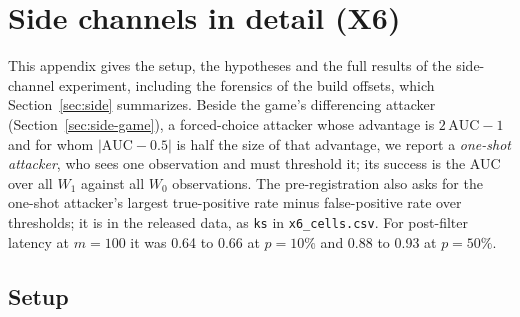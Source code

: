 
\section{Side channels in detail (X6)}\label{app:side}

This appendix gives the setup, the hypotheses and the full results of the side-channel experiment, including the
forensics of the build offsets, which Section~\ref{sec:side} summarizes. Beside the game's differencing attacker
(Section~\ref{sec:side-game}), a forced-choice attacker whose advantage is $2\,\mathrm{AUC} - 1$ and for whom $|\mathrm{AUC} - 0.5|$ is half the
size of that advantage, we report a \emph{one-shot attacker}, who sees one observation and must threshold it; its
success is the AUC over all $W_1$ against all $W_0$ observations. The pre-registration also asks for the one-shot attacker's largest true-positive rate minus false-positive rate over thresholds; it is in the released data, as \texttt{ks} in \texttt{x6\_cells.csv}. For post-filter latency at $m = 100$ it was 0.64 to 0.66 at $p = 10\%$ and 0.88 to 0.93 at $p = 50\%$.

\subsection{Setup}\label{sec:side-setup}

